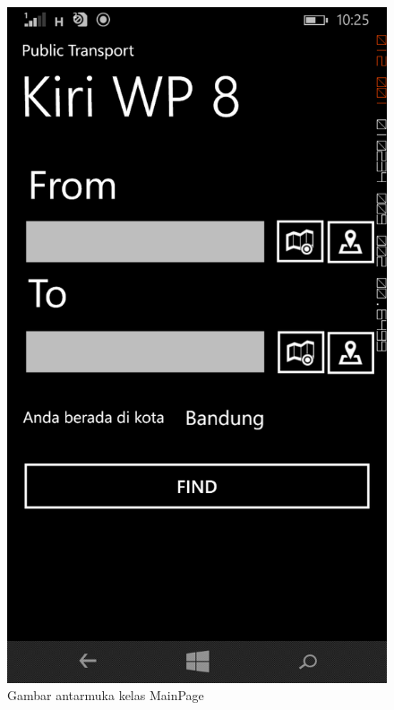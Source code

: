 	\begin{figure}[!h]
		\centering
			\includegraphics[scale=0.2]{Gambar/antarmuka/home}
		\caption{Gambar antarmuka kelas MainPage}
		\label{fig:antarmuka MainPage}
	\end{figure}
	
	\newpage
	
